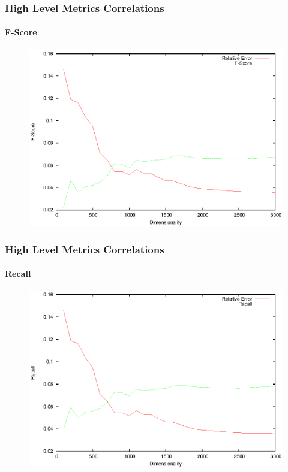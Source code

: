 \documentclass{beamer}
\begin{document}
\begin{frame}
\frametitle{High Level Metrics Correlations}
\framesubtitle{F-Score}
 		\begin{figure}
		\includegraphics[scale=0.88]{fscore.eps}
	\end{figure}
\end{frame}


\begin{frame}
\frametitle{High Level Metrics Correlations}
\framesubtitle{Recall}
 		\begin{figure}
		\includegraphics[scale=0.88]{recall.eps}
	\end{figure}
\end{frame}
\end{document}
